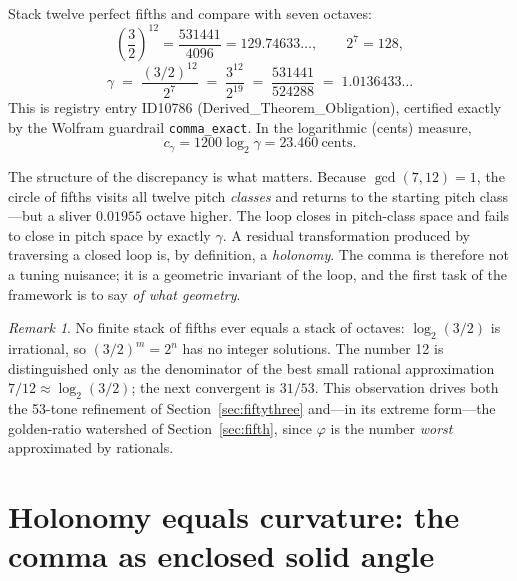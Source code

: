 \documentclass[11pt]{article}
\theoremstyle{remark}
\newtheorem{remark}[theorem]{Remark}
\begin{document}
Stack twelve perfect fifths and compare with seven octaves:
\begin{equation}
\left(\frac{3}{2}\right)^{12} = \frac{531441}{4096} = 129.74633\ldots, \qquad 2^7 = 128,
\end{equation}
\begin{equation}
\gamma \;=\; \frac{(3/2)^{12}}{2^7} \;=\; \frac{3^{12}}{2^{19}} \;=\; \frac{531441}{524288} \;=\; 1.0136433\ldots
\label{eq:comma}
\end{equation}
This is registry entry ID10786 (Derived\_Theorem\_Obligation), certified exactly by the Wolfram guardrail \texttt{comma\_exact}. In the logarithmic (cents) measure,
\begin{equation}
c_\gamma = 1200 \log_2 \gamma = 23.460\ \text{cents}.
\end{equation}

The structure of the discrepancy is what matters. Because $\gcd(7,12) = 1$, the circle of fifths visits all twelve pitch \emph{classes} and returns to the starting pitch class---but a sliver $0.01955$ octave higher. The loop closes in pitch-class space and fails to close in pitch space by exactly $\gamma$. A residual transformation produced by traversing a closed loop is, by definition, a \emph{holonomy}. The comma is therefore not a tuning nuisance; it is a geometric invariant of the loop, and the first task of the framework is to say \emph{of what geometry}.

\begin{remark}
No finite stack of fifths ever equals a stack of octaves: $\log_2(3/2)$ is irrational, so $(3/2)^m = 2^n$ has no integer solutions. The number 12 is distinguished only as the denominator of the best small rational approximation $7/12 \approx \log_2(3/2)$; the next convergent is $31/53$. This observation drives both the 53-tone refinement of Section~\ref{sec:fiftythree} and---in its extreme form---the golden-ratio watershed of Section~\ref{sec:fifth}, since $\varphi$ is the number \emph{worst} approximated by rationals.
\end{remark}

\section{Holonomy equals curvature: the comma as enclosed solid angle}
\label{sec:curvature}
\end{document}
